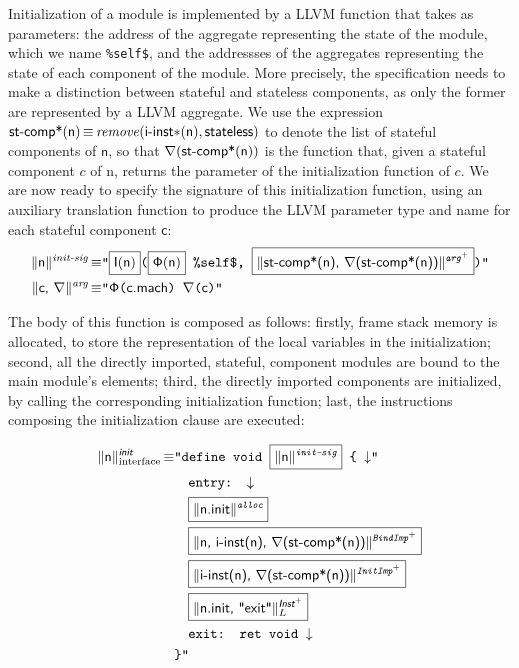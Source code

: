 \documentclass{llncs}
\newcommand{\trad}[2]{\ensuremath{\lVert \textsf{#1} \rVert^{\textit{#2}}}}
\newcommand{\nl}[0]{\ensuremath{\downarrow}}
\DeclareMathOperator{\isdef}{\equiv}
\newcommand{\llvm}[1]{\texttt{#1}}
\newcommand{\B}[1]{\textsf{#1}}
\newcommand{\ListOf}[1]{$\mbox{#1}^+$}
\newcommand{\PH}[1]{\framebox{$#1$}}
\newcommand{\stateless}[0]{\ensuremath{\textsf{stateless}}}
\newcommand{\importedinstances}[0]{\ensuremath{\textsf{i-inst}}}
\newcommand{\trimportedinstances}[0]{\ensuremath{\textsf{i-inst$\mathsf{\ast}$}}}
\newcommand{\stateref}[0]{\ensuremath{\sf\Phi}}
\newcommand{\self}[0]{\llvm{\%self\$}}
\newcommand{\init}[0]{\ensuremath{\mathsf{I}}}
\begin{document}
Initialization of a module is implemented by a LLVM function that takes as
parameters: the address of the aggregate representing the state of the module,
which we name \self, and the addressses of the aggregates representing
the state of each component of the module.  More precisely, the specification
needs to make a distinction between stateful and stateless components, as only
the former are represented by a LLVM aggregate. We use the expression
$\components(\B{n}) \isdef \mathit{remove}(\trimportedinstances(\B{n}),
\stateless)$ to denote the list of stateful components of $\B{n}$, so that
$\argname(\components(\B{n}))$ is the function that, given a stateful component
$c$ of \B{n}, returns the parameter of the initialization function of $c$. We
are now ready to specify the signature of this initialization function, using an
auxiliary translation function to produce the LLVM parameter type and name for
each stateful component $\B{c}$:
\begin{align*}
\trad{\B{n}}{init-sig} \isdef &
\llvm{"\PH{\init(\B{n})}(\PH{\stateref(\B{n})} \self, 
  \PH{\trad{\components(\B{n}), \argname(\components(\B{n}))}{\ListOf{arg}}})"} \\
\trad{\B{c}, \argname}{arg} \isdef & \llvm{"\stateref(\B{c.mach}) \argname(\B{c})"}
\end{align*}

The body of this function is composed as follows: firstly, frame stack memory is
allocated, to store the representation of the local variables in the
initialization; second, all the directly imported, stateful, component modules
are bound to the main module's elements; third, the directly imported components
are initialized, by calling the corresponding initialization function; last, the
instructions composing the initialization clause are executed:

\begin{align*}
  \trad{\B{n}}{\B{init}}_{\text{interface}} \isdef
  & \llvm{"define void \PH{\trad{\B{n}}{init-sig}} \{ \nl"} \\
  & \quad\llvm{entry: \nl} \\
  & \quad\llvm{\PH{\trad{n.init}{alloc}}} \\
  & \quad\llvm{\PH{\trad{n, \importedinstances(n), \argname(\components(\B{n}))}{\ListOf{BindImp}}}} \\
  & \quad\llvm{\PH{\trad{\importedinstances(n), \argname(\components(\B{n}))}{\ListOf{InitImp}}}} \\
  & \quad\llvm{\PH{\trad{n.init, "exit"}{\ListOf{\B{Inst}}}_L}} \\
  & \quad\llvm{exit: ret void \nl} \\
  & \llvm{\}"}
\end{align*}
\end{document}
